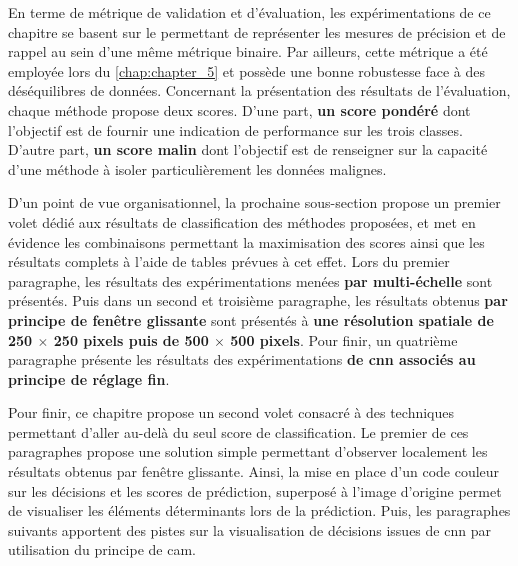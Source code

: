 En terme de métrique de validation et d'évaluation, les expérimentations de ce chapitre se basent sur le \textbf{\fscore{}} permettant de représenter les mesures de précision et de rappel au sein d'une même métrique binaire. Par ailleurs, cette métrique a été employée lors du \cref{chap:chapter_5} et possède une bonne robustesse face à des déséquilibres de données. Concernant la présentation des résultats de l'évaluation, chaque méthode propose deux scores. D'une part, \textbf{un score pondéré} dont l'objectif est de fournir une indication de performance sur les trois classes. D'autre part, \textbf{un score malin} dont l'objectif est de renseigner sur la capacité d'une méthode à isoler particulièrement les données malignes.\par

D'un point de vue organisationnel, la prochaine sous-section propose un premier volet dédié aux résultats de classification des méthodes proposées, et met en évidence les combinaisons permettant la maximisation des scores ainsi que les résultats complets à l'aide de tables prévues à cet effet. Lors du premier paragraphe, les résultats des expérimentations menées \textbf{par multi-échelle} sont présentés. Puis dans un second et troisième paragraphe, les résultats obtenus \textbf{par principe de fenêtre glissante} sont présentés à \textbf{une résolution spatiale de 250 $\times$ 250 pixels puis de 500 $\times$ 500 pixels}. Pour finir, un quatrième paragraphe présente les résultats des expérimentations \textbf{de \gls{cnn} associés au principe de réglage fin}.\par

Pour finir, ce chapitre propose un second volet consacré à des techniques permettant d'aller au-delà du seul score de classification. Le premier de ces paragraphes propose une solution simple permettant d'observer localement les résultats obtenus par fenêtre glissante. Ainsi, la mise en place d'un code couleur sur les décisions et les scores de prédiction, superposé à l'image d'origine permet de visualiser les éléments déterminants lors de la prédiction. Puis, les paragraphes suivants apportent des pistes sur la visualisation de décisions issues de \gls{cnn} par utilisation du principe de \gls{cam}.\par
\clearpage


